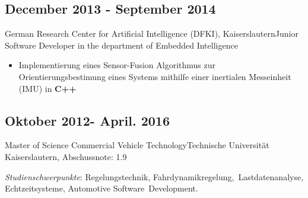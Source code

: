 \documentclass{mycv}
\begin{document}
{\rlap{\color{templateColor1}\rule[0mm]{\textwidth}{\ulinewidth}}}
\begin{paracol}{2}

\switchcolumn
{}

		\subsection{December 2013 - September 2014}{German Research Center for
			Artificial Intelligence (DFKI), \quad Kaiserslautern}{Junior Software Developer in the department of Embedded
		Intelligence} 
	  \begin{itemize}
			\item Implementierung eines Sensor-Fusion Algorithmus zur
				\,Orientierungsbestimung eines Systems mithilfe einer inertialen
				Messeinheit (IMU) in {\bfseries C++}\\
	  \end{itemize}


		\subsection{Oktober 2012- April. 2016}{Master of Science Commercial Vehicle
		Technology}{Technische Universit{\"a}t Kaiserslautern, {Abschussnote: 1.9}}

		{\textit{Studienschwerpunkte}}: Regelungstechnik, Fahrdynamikregelung,
		\,Lastdatenanalyse, Echtzeitsysteme, Automotive	Software \,Development.\\


\end{paracol}
\end{document}
